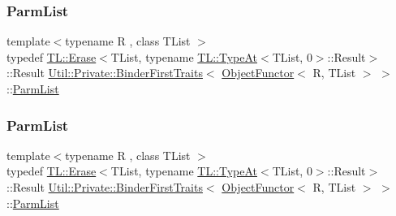 \subsubsection{\texorpdfstring{ParmList}{ParmList}\hspace{0.1cm}{\footnotesize\ttfamily [1/3]}}
{\footnotesize\ttfamily template$<$typename R , class T\+List $>$ \\
typedef \mbox{\hyperlink{structUtil_1_1TL_1_1Erase}{T\+L\+::\+Erase}}$<$T\+List, typename \mbox{\hyperlink{structUtil_1_1TL_1_1TypeAt}{T\+L\+::\+Type\+At}}$<$T\+List, 0$>$\+::Result$>$\+::Result \mbox{\hyperlink{structUtil_1_1Private_1_1BinderFirstTraits}{Util\+::\+Private\+::\+Binder\+First\+Traits}}$<$ \mbox{\hyperlink{classUtil_1_1ObjectFunctor}{Object\+Functor}}$<$ R, T\+List $>$ $>$\+::\mbox{\hyperlink{structUtil_1_1Private_1_1BinderFirstTraits_3_01ObjectFunctor_3_01R_00_01TList_01_4_01_4_a181ef1a7b945beef449f25ba47f49bbc}{Parm\+List}}}

\mbox{\label{structUtil_1_1Private_1_1BinderFirstTraits_3_01ObjectFunctor_3_01R_00_01TList_01_4_01_4_a181ef1a7b945beef449f25ba47f49bbc}} 
\subsubsection{\texorpdfstring{ParmList}{ParmList}\hspace{0.1cm}{\footnotesize\ttfamily [2/3]}}
{\footnotesize\ttfamily template$<$typename R , class T\+List $>$ \\
typedef \mbox{\hyperlink{structUtil_1_1TL_1_1Erase}{T\+L\+::\+Erase}}$<$T\+List, typename \mbox{\hyperlink{structUtil_1_1TL_1_1TypeAt}{T\+L\+::\+Type\+At}}$<$T\+List, 0$>$\+::Result$>$\+::Result \mbox{\hyperlink{structUtil_1_1Private_1_1BinderFirstTraits}{Util\+::\+Private\+::\+Binder\+First\+Traits}}$<$ \mbox{\hyperlink{classUtil_1_1ObjectFunctor}{Object\+Functor}}$<$ R, T\+List $>$ $>$\+::\mbox{\hyperlink{structUtil_1_1Private_1_1BinderFirstTraits_3_01ObjectFunctor_3_01R_00_01TList_01_4_01_4_a181ef1a7b945beef449f25ba47f49bbc}{Parm\+List}}}

